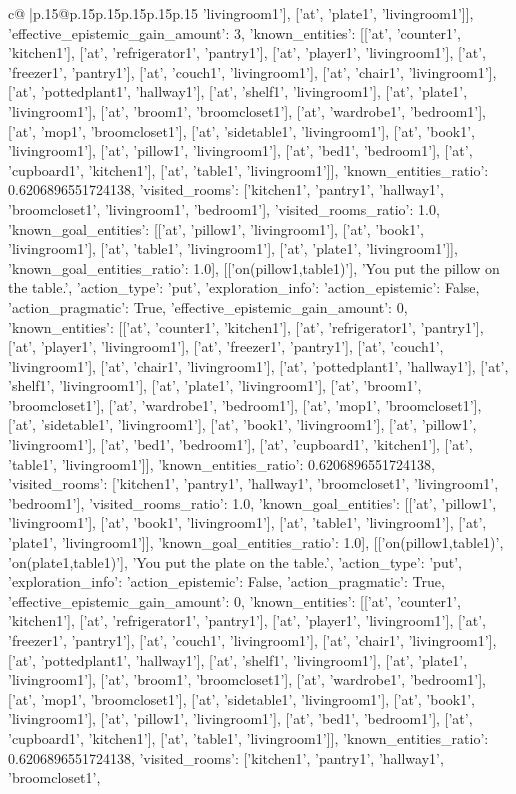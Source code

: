 \documentclass{article}
\begin{document}
{\begin{supertabular}{c@{$\;$}|p{.15\linewidth}@{}p{.15\linewidth}p{.15\linewidth}p{.15\linewidth}p{.15\linewidth}p{.15\linewidth}}
{{{'livingroom1'], ['at', 'plate1', 'livingroom1']], 'effective_epistemic_gain_amount': 3, 'known_entities': [['at', 'counter1', 'kitchen1'], ['at', 'refrigerator1', 'pantry1'], ['at', 'player1', 'livingroom1'], ['at', 'freezer1', 'pantry1'], ['at', 'couch1', 'livingroom1'], ['at', 'chair1', 'livingroom1'], ['at', 'pottedplant1', 'hallway1'], ['at', 'shelf1', 'livingroom1'], ['at', 'plate1', 'livingroom1'], ['at', 'broom1', 'broomcloset1'], ['at', 'wardrobe1', 'bedroom1'], ['at', 'mop1', 'broomcloset1'], ['at', 'sidetable1', 'livingroom1'], ['at', 'book1', 'livingroom1'], ['at', 'pillow1', 'livingroom1'], ['at', 'bed1', 'bedroom1'], ['at', 'cupboard1', 'kitchen1'], ['at', 'table1', 'livingroom1']], 'known_entities_ratio': 0.6206896551724138, 'visited_rooms': ['kitchen1', 'pantry1', 'hallway1', 'broomcloset1', 'livingroom1', 'bedroom1'], 'visited_rooms_ratio': 1.0, 'known_goal_entities': [['at', 'pillow1', 'livingroom1'], ['at', 'book1', 'livingroom1'], ['at', 'table1', 'livingroom1'], ['at', 'plate1', 'livingroom1']], 'known_goal_entities_ratio': 1.0}}], [['on(pillow1,table1)'], 'You put the pillow on the table.', {'action_type': 'put', 'exploration_info': {'action_epistemic': False, 'action_pragmatic': True, 'effective_epistemic_gain_amount': 0, 'known_entities': [['at', 'counter1', 'kitchen1'], ['at', 'refrigerator1', 'pantry1'], ['at', 'player1', 'livingroom1'], ['at', 'freezer1', 'pantry1'], ['at', 'couch1', 'livingroom1'], ['at', 'chair1', 'livingroom1'], ['at', 'pottedplant1', 'hallway1'], ['at', 'shelf1', 'livingroom1'], ['at', 'plate1', 'livingroom1'], ['at', 'broom1', 'broomcloset1'], ['at', 'wardrobe1', 'bedroom1'], ['at', 'mop1', 'broomcloset1'], ['at', 'sidetable1', 'livingroom1'], ['at', 'book1', 'livingroom1'], ['at', 'pillow1', 'livingroom1'], ['at', 'bed1', 'bedroom1'], ['at', 'cupboard1', 'kitchen1'], ['at', 'table1', 'livingroom1']], 'known_entities_ratio': 0.6206896551724138, 'visited_rooms': ['kitchen1', 'pantry1', 'hallway1', 'broomcloset1', 'livingroom1', 'bedroom1'], 'visited_rooms_ratio': 1.0, 'known_goal_entities': [['at', 'pillow1', 'livingroom1'], ['at', 'book1', 'livingroom1'], ['at', 'table1', 'livingroom1'], ['at', 'plate1', 'livingroom1']], 'known_goal_entities_ratio': 1.0}}], [['on(pillow1,table1)', 'on(plate1,table1)'], 'You put the plate on the table.', {'action_type': 'put', 'exploration_info': {'action_epistemic': False, 'action_pragmatic': True, 'effective_epistemic_gain_amount': 0, 'known_entities': [['at', 'counter1', 'kitchen1'], ['at', 'refrigerator1', 'pantry1'], ['at', 'player1', 'livingroom1'], ['at', 'freezer1', 'pantry1'], ['at', 'couch1', 'livingroom1'], ['at', 'chair1', 'livingroom1'], ['at', 'pottedplant1', 'hallway1'], ['at', 'shelf1', 'livingroom1'], ['at', 'plate1', 'livingroom1'], ['at', 'broom1', 'broomcloset1'], ['at', 'wardrobe1', 'bedroom1'], ['at', 'mop1', 'broomcloset1'], ['at', 'sidetable1', 'livingroom1'], ['at', 'book1', 'livingroom1'], ['at', 'pillow1', 'livingroom1'], ['at', 'bed1', 'bedroom1'], ['at', 'cupboard1', 'kitchen1'], ['at', 'table1', 'livingroom1']], 'known_entities_ratio': 0.6206896551724138, 'visited_rooms': ['kitchen1', 'pantry1', 'hallway1', 'broomcloset1', }}}
\end{supertabular}}
\end{document}

